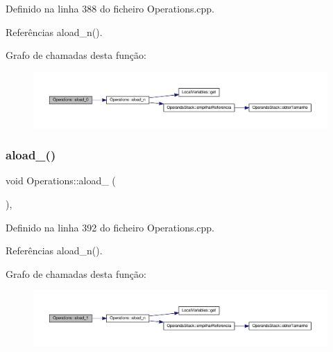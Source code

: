 Definido na linha 388 do ficheiro Operations.\+cpp.



Referências aload\+\_\+n().

Grafo de chamadas desta função\+:
\nopagebreak
\begin{figure}[H]
\begin{center}
\leavevmode
\includegraphics[width=350pt]{classOperations_a9d821a16ef0681755717e8c4f740f6d0_cgraph}
\end{center}
\end{figure}
\mbox{\label{classOperations_a8291f2b716c1be7428d9b63a5225b52d}} 
\subsubsection{\texorpdfstring{aload\+\_()}{aload\_1()}}
{\footnotesize\ttfamily void Operations\+::aload\+\_ (\begin{DoxyParamCaption}{ }\end{DoxyParamCaption})\hspace{0.3cm}{\ttfamily [static]}, {\ttfamily [private]}}



Definido na linha 392 do ficheiro Operations.\+cpp.



Referências aload\+\_\+n().

Grafo de chamadas desta função\+:
\nopagebreak
\begin{figure}[H]
\begin{center}
\leavevmode
\includegraphics[width=350pt]{classOperations_a8291f2b716c1be7428d9b63a5225b52d_cgraph}
\end{center}
\end{figure}
\mbox{\label{classOperations_abd58f463152d7f88b9fb2f133c6ca184}} 
